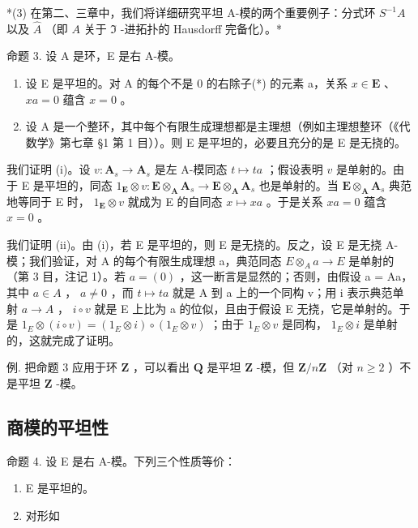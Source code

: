 *(3) 在第二、三章中，我们将详细研究平坦 A-模的两个重要例子：分式环 \(S^{-1}A\) 以及 \(\hat{A}\) （即 \(A\) 关于 \(\mathfrak{I}\) -进拓扑的 Hausdorff 完备化）。*

命题 3. 设 A 是环，E 是右 A-模。

\begin{enumerate}
\def\labelenumi{(\roman{enumi})}
\item
  设 E 是平坦的。对 A 的每个不是 0 的右除子(*) 的元素 a，关系 \(x \in \mathbf{E}\) 、 \(xa = 0\) 蕴含 \(x = 0\) 。
\item
  设 A 是一个整环，其中每个有限生成理想都是主理想（例如主理想整环（《代数学》第七章 §1 第 1 目））。则 E 是平坦的，必要且充分的是 E 是无挠的。
\end{enumerate}

我们证明 (i)。设 \(v: \mathbf{A}_s \to \mathbf{A}_s\) 是左 A-模同态 \(t \mapsto ta\) ；假设表明 \(v\) 是单射的。由于 E 是平坦的，同态 \(1_{\mathbf{E}} \otimes v: \mathbf{E} \otimes_{\mathbf{A}} \mathbf{A}_s \to \mathbf{E} \otimes_{\mathbf{A}} \mathbf{A}_s\) 也是单射的。当 \(\mathbf{E} \otimes_{\mathbf{A}} \mathbf{A}_s\) 典范地等同于 E 时， \(1_{\mathbf{E}} \otimes v\) 就成为 E 的自同态 \(x \mapsto xa\) 。于是关系 \(xa = 0\) 蕴含 \(x = 0\) 。

我们证明 (ii)。由 (i)，若 E 是平坦的，则 E 是无挠的。反之，设 E 是无挠 A-模；我们验证，对 A 的每个有限生成理想 a，典范同态 \(E \otimes_{A} a \to E\) 是单射的（第 3 目，注记 1）。若 \(a = (0)\) ，这一断言是显然的；否则，由假设 a = Aa，其中 \(a \in A\) ， \(a \neq 0\) ，而 \(t \mapsto ta\) 就是 A 到 a 上的一个同构 v；用 i 表示典范单射 \(a \to A\) ， \(i \circ v\) 就是 E 上比为 a 的位似，且由于假设 E 无挠，它是单射的。于是 \(1_{E} \otimes (i \circ v) = (1_{E} \otimes i) \circ (1_{E} \otimes v)\) ；由于 \(1_{E} \otimes v\) 是同构， \(1_{E} \otimes i\) 是单射的，这就完成了证明。

例. 把命题 3 应用于环 \(\mathbf{Z}\) ，可以看出 \(\mathbf{Q}\) 是平坦 \(\mathbf{Z}\) -模，但 \(\mathbf{Z}/n\mathbf{Z}\) （对 \(n \geqslant 2\) ）不是平坦 \(\mathbf{Z}\) -模。

\subsection{商模的平坦性}

命题 4. 设 E 是右 A-模。下列三个性质等价：

\begin{enumerate}
\def\labelenumi{(\alph{enumi})}
\item
  E 是平坦的。
\item
  对形如
\end{enumerate}

